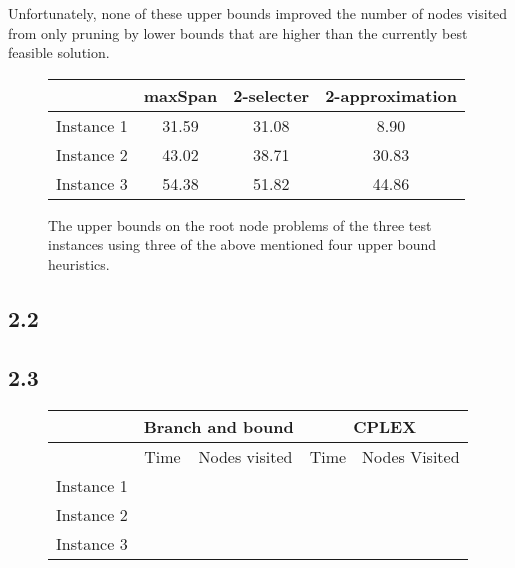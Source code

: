 \documentclass[12pt]{article}
\begin{document}
Unfortunately, none of these upper bounds improved the number of nodes visited from only pruning by lower bounds that are higher than the currently best feasible solution. 
\begin{figure}
\begin{tabular}{|c|c|c|c|}
\hline
&maxSpan & 2-selecter & 2-approximation\\
\hline
Instance 1 & 31.59 & 31.08 & 8.90 \\
\hline
Instance 2 & 43.02 & 38.71 & 30.83\\
\hline
Instance 3 & 54.38 & 51.82 & 44.86\\
\hline
\end{tabular}
\caption{The upper bounds on the root node problems of the three test instances using three of the above mentioned four upper bound heuristics.\label{upperbounds}}
\end{figure}

\subsection*{2.2}

\subsection*{2.3}

\begin{figure}
\begin{tabular}{|c | c | c | c | c |}
\hline
& \multicolumn{2}{|c|}{Branch and bound} & \multicolumn{2}{|c|}{CPLEX} \\
\hline 
& Time & Nodes visited & Time & Nodes Visited\\
\hline
Instance 1 & & & & \\
\hline
Instance 2 & & & & \\
\hline
Instance 3 & & & & \\
\hline 
\end{tabular}
\end{figure}
\end{document}
